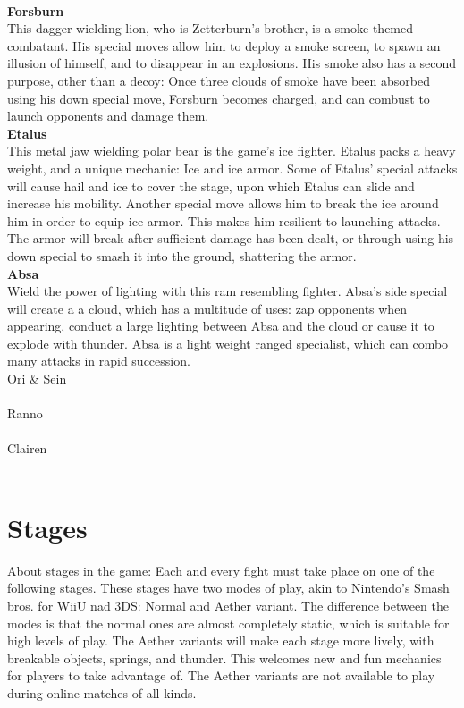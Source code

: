 \documentclass{article}
\begin{document}
\\
\textbf{Forsburn}\\
This dagger wielding lion, who is Zetterburn's brother, is a smoke themed combatant. His special moves allow him to deploy a smoke screen, to spawn an illusion of himself, and to disappear in an explosions. His smoke also has a second purpose, other than a decoy: Once three clouds of smoke have been absorbed using his down special move, Forsburn becomes charged, and can combust to launch opponents and damage them.
\\
\textbf{Etalus}\\
This metal jaw wielding polar bear is the game's ice fighter. Etalus packs a heavy weight, and a unique mechanic: Ice and ice armor. Some of Etalus' special attacks will cause hail and ice to cover the stage, upon which Etalus can slide and increase his mobility. Another special move allows him to break the ice around him in order to equip ice armor. This makes him resilient to launching attacks. The armor will break after sufficient damage has been dealt, or through using his down special to smash it into the ground, shattering the armor.
\\
\textbf{Absa}\\
Wield the power of lighting with this ram resembling fighter. Absa's side special will create a a cloud, which has a multitude of uses: zap opponents when appearing, conduct a large lighting between Absa and the cloud or cause it to explode with thunder. Absa is a light weight ranged specialist, which can combo many attacks in rapid succession.
\\
Ori \& Sein\\
\\
Ranno\\
\\
Clairen\\
\\

\chapter{Stages}

About stages in the game: Each and every fight must take place on one of the following stages. These stages have two modes of play, akin to Nintendo's Smash bros. for WiiU nad 3DS: Normal and Aether variant. The difference between the modes is that the normal ones are almost completely static, which is suitable for high levels of play. The Aether variants will make each stage more lively, with breakable objects, springs, and thunder. This welcomes new and fun mechanics for players to take advantage of. The Aether variants are not available to play during online matches of all kinds.\\
\end{document}
